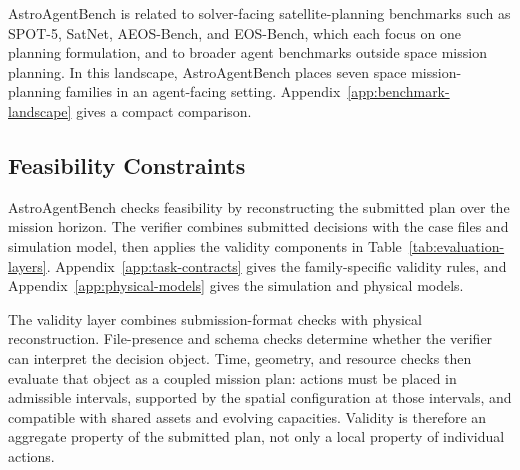 \documentclass[11pt]{article}
\begin{document}
AstroAgentBench is related to solver-facing satellite-planning benchmarks such as SPOT-5, SatNet, AEOS-Bench, and EOS-Bench, which each focus on one planning formulation, and to broader agent benchmarks outside space mission planning. In this landscape, AstroAgentBench places seven space mission-planning families in an agent-facing setting. Appendix~\ref{app:benchmark-landscape} gives a compact comparison.

\subsection{Feasibility Constraints}
\label{sec:feasibility-constraints}

AstroAgentBench checks feasibility by reconstructing the submitted plan over the mission horizon. The verifier combines submitted decisions with the case files and simulation model, then applies the validity components in Table~\ref{tab:evaluation-layers}. Appendix~\ref{app:task-contracts} gives the family-specific validity rules, and Appendix~\ref{app:physical-models} gives the simulation and physical models.

The validity layer combines submission-format checks with physical reconstruction. File-presence and schema checks determine whether the verifier can interpret the decision object. Time, geometry, and resource checks then evaluate that object as a coupled mission plan: actions must be placed in admissible intervals, supported by the spatial configuration at those intervals, and compatible with shared assets and evolving capacities. Validity is therefore an aggregate property of the submitted plan, not only a local property of individual actions.
\end{document}
